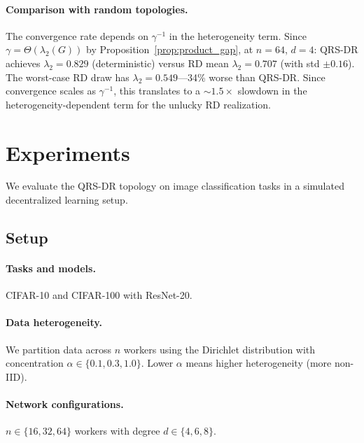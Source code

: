 \documentclass{article}
\newcommand{\lam}{\lambda_2}
\begin{document}
\paragraph{Comparison with random topologies.}
The convergence rate depends on $\gamma^{-1}$ in the heterogeneity
term.  Since $\gamma = \Theta(\lam(G))$ by Proposition~\ref{prop:product_gap},
at $n = 64$, $d = 4$: QRS-DR achieves $\lam = 0.829$ (deterministic) versus
RD mean $\lam = 0.707$ (with std $\pm 0.16$).  The worst-case RD draw
has $\lam = 0.549$---34\% worse than QRS-DR.  Since convergence scales
as $\gamma^{-1}$, this translates to a $\sim\!1.5\times$ slowdown in the
heterogeneity-dependent term for the unlucky RD realization.


\section{Experiments}
\label{sec:experiments}

We evaluate the QRS-DR topology on image classification tasks
in a simulated decentralized learning setup.

\subsection{Setup}
\label{sec:exp_setup}

\paragraph{Tasks and models.}
CIFAR-10 and CIFAR-100 \cite{cifar} with ResNet-20.

\paragraph{Data heterogeneity.}
We partition data across $n$ workers using the Dirichlet distribution
with concentration $\alpha \in \{0.1, 0.3, 1.0\}$.  Lower $\alpha$
means higher heterogeneity (more non-IID).

\paragraph{Network configurations.}
$n \in \{16, 32, 64\}$ workers with degree $d \in \{4, 6, 8\}$.
\end{document}
